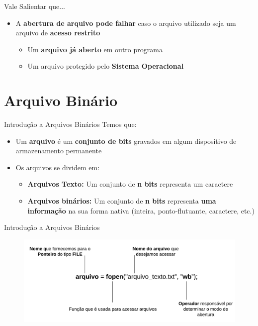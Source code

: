 \begin{frame}{Vale Salientar que...}
\begin{itemize}
    \item A \textbf{abertura de arquivo pode falhar} caso o arquivo utilizado seja um arquivo de \textbf{acesso restrito}
    \begin{itemize}
        \item Um \textbf{arquivo já aberto} em outro programa
        \item Um arquivo protegido pelo \textbf{Sistema Operacional}
    \end{itemize}
\end{itemize}
\end{frame}



\section{Arquivo Binário}
\begin{frame}{Introdução a Arquivos Binários}
Temos que:
\begin{itemize}
    \item Um \textbf{arquivo} é um \textbf{conjunto de bits} gravados em algum dispositivo de armazenamento permanente
    \item Os arquivos se dividem em:
    \begin{itemize}
        \item \textbf{Arquivos Texto:} Um conjunto de \textbf{n bits} representa um caractere
        \item \textbf{Arquivos binários:} Um conjunto de \textbf{n bits} representa \textbf{uma informação} na sua forma nativa (inteira, ponto-flutuante, caractere, etc.)
    \end{itemize}
\end{itemize}
\end{frame}

\begin{frame}{Introdução a Arquivos Binários}
    \begin{figure}
        \centering
        \includegraphics[width=1\linewidth]{figuras/bin.png}
    \end{figure}
\end{frame}

